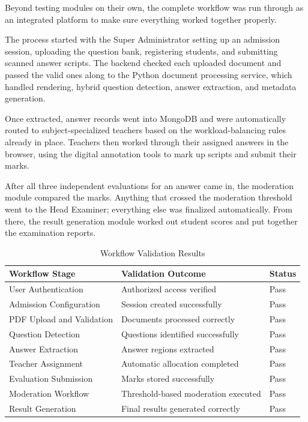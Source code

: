 Beyond testing modules on their own, the complete workflow was run through as an integrated platform to make sure everything worked together properly.

The process started with the Super Administrator setting up an admission session, uploading the question bank, registering students, and submitting scanned answer scripts. The backend checked each uploaded document and passed the valid ones along to the Python document processing service, which handled rendering, hybrid question detection, answer extraction, and metadata generation.

Once extracted, answer records went into MongoDB and were automatically routed to subject-specialized teachers based on the workload-balancing rules already in place. Teachers then worked through their assigned answers in the browser, using the digital annotation tools to mark up scripts and submit their marks.

After all three independent evaluations for an answer came in, the moderation module compared the marks. Anything that crossed the moderation threshold went to the Head Examiner; everything else was finalized automatically. From there, the result generation module worked out student scores and put together the examination reports.

\begin{table}[H]
\centering
\caption{Workflow Validation Results}
\label{tab:workflow_validation}
\begin{tabular}{|p{6cm}|p{5cm}|p{2cm}|}
\hline
\textbf{Workflow Stage} & \textbf{Validation Outcome} & \textbf{Status} \\
\hline
User Authentication & Authorized access verified & Pass \\
\hline
Admission Configuration & Session created successfully & Pass \\
\hline
PDF Upload and Validation & Documents processed correctly & Pass \\
\hline
Question Detection & Questions identified successfully & Pass \\
\hline
Answer Extraction & Answer regions extracted & Pass \\
\hline
Teacher Assignment & Automatic allocation completed & Pass \\
\hline
Evaluation Submission & Marks stored successfully & Pass \\
\hline
Moderation Workflow & Threshold-based moderation executed & Pass \\
\hline
Result Generation & Final results generated correctly & Pass \\
\hline
\end{tabular}
\end{table}

